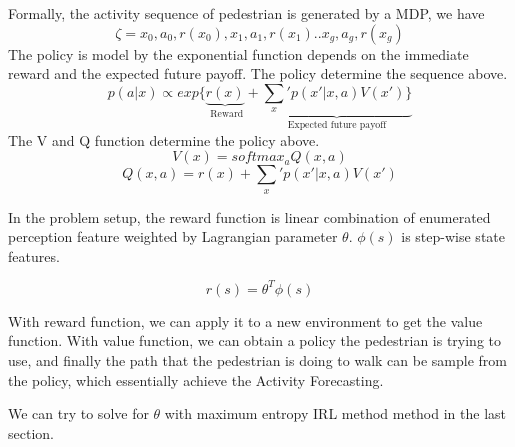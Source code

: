 \documentclass[11pt]{article}
\begin{document}
Formally, the activity sequence of pedestrian is generated by a MDP, we have 
$$\zeta={x_0,a_0,r(x_0),x_1,a_1,r(x_1)..x_g,a_g,r(x_g)}$$
The policy is model by the exponential function depends on the immediate reward and the expected future payoff. The policy determine the sequence above. 
$$ p(a|x) \propto exp\{\underbrace{r(x)}_\text{ Reward}+\underbrace{\sum_x'p(x'|x,a)V(x')\}}_\text{Expected future payoff}$$
The V and Q function determine the policy above.
$$V(x)=softmax_aQ(x,a)$$
$$Q(x,a)=r(x)+\sum_x'p(x'|x,a)V(x')$$

In the problem setup, the reward function is linear combination of enumerated perception feature weighted by Lagrangian parameter $\theta$. $\phi(s)$ is step-wise state features.

$$r(s)=\theta^{T}\phi(s)$$

With reward function, we can apply it to a new environment to get the value function. With value function, we can obtain a policy the pedestrian is trying to use, and finally the path that the pedestrian is doing to walk can be sample from the policy, which essentially achieve the Activity Forecasting.



We can try to solve for $\theta$ with maximum entropy IRL method method in the last section.
\end{document}
